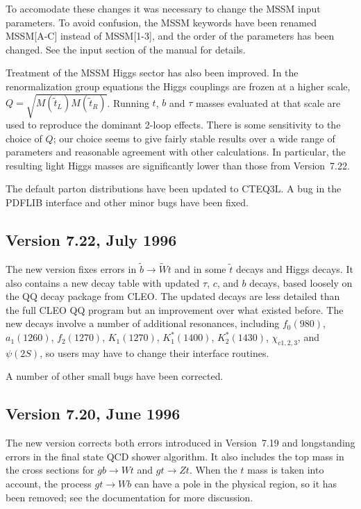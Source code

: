       To accomodate these changes it was necessary to change the
MSSM input parameters.  To avoid confusion, the MSSM keywords have
been renamed MSSM[A-C] instead of MSSM[1-3], and the order of the
parameters has been changed.  See the input section of the manual for
details.

      Treatment of the MSSM Higgs sector has also been improved.  In
the renormalization group equations the Higgs couplings are frozen at
a higher scale, $Q = \sqrt{M(\tilde t_L)M(\tilde t_R)}$.  Running
$t$, $b$ and $\tau$ masses evaluated at that scale are used to
reproduce the dominant 2-loop effects.  There is some sensitivity to
the choice of $Q$; our choice seems to give fairly stable results over
a wide range of parameters and reasonable agreement with other
calculations.  In particular, the resulting light Higgs masses are
significantly lower than those from Version~7.22.  

      The default parton distributions have been updated to CTEQ3L.
A bug in the PDFLIB interface and other minor bugs have been fixed.

\subsection{Version 7.22, July 1996}

      The new version fixes errors in $\tilde b \to \tilde W t$ and in
some $\tilde t$ decays and Higgs decays. It also contains a new decay
table with updated $\tau$, $c$, and $b$ decays, based loosely on the
QQ decay package from CLEO.  The updated decays are less detailed than
the full CLEO QQ program but an improvement over what existed before.
The new decays involve a number of additional resonances, including
$f_0(980)$, $a_1(1260)$, $f_2(1270)$, $K_1(1270)$, $K_1^*(1400)$,
$K_2^*(1430)$, $\chi_{c1,2,3}$, and $\psi(2S)$, so users may have to
change their interface routines.

      A number of other small bugs have been corrected.

\subsection{Version 7.20, June 1996}

      The new version corrects both errors introduced in Version~7.19
and longstanding errors in the final state QCD shower algorithm. It
also includes the top mass in the cross sections for $g b \to W t$ and
$g t \to Z t$. When the $t$ mass is taken into account, the process $g
t \to W b$ can have a pole in the physical region, so it has been
removed; see the documentation for more discussion. 

